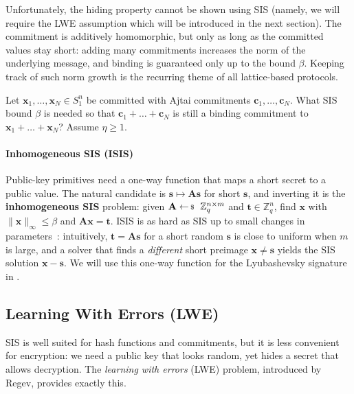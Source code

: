\documentclass[../../book.tex]{subfiles}
\begin{document}
Unfortunately, the hiding property cannot be shown using SIS (namely, we will require the LWE assumption which will be introduced in the next section).
The commitment is additively homomorphic, but only as long as the committed values stay short: adding many commitments increases the norm of the underlying message, and binding is guaranteed only up to the bound $\beta$.
Keeping track of such norm growth is the recurring theme of all lattice-based protocols.

\begin{exercise}
    Let $\mathbf{x}_1,\dots,\mathbf{x}_N \in S_1^n$ be committed with Ajtai commitments $\mathbf{c}_1,\dots,\mathbf{c}_N$.
    What SIS bound $\beta$ is needed so that $\mathbf{c}_1+\dots+\mathbf{c}_N$ is still a binding commitment to $\mathbf{x}_1+\dots+\mathbf{x}_N$? Assume $\eta \geq 1$.
    
\end{exercise}

\paragraph{Inhomogeneous SIS (ISIS)}
Public-key primitives need a one-way function that maps a short secret to a public value.
The natural candidate is $\mathbf{s} \mapsto \mathbf{A}\mathbf{s}$ for short $\mathbf{s}$, and inverting it is the \textbf{inhomogeneous SIS} problem: given $\mathbf{A} \leftarrowS \mathbb{Z}_q^{n \times m}$ and $\mathbf{t} \in \mathbb{Z}_q^n$, find $\mathbf{x}$ with $\|\mathbf{x}\|_{\infty} \leq \beta$ and $\mathbf{A}\mathbf{x} = \mathbf{t}$.
ISIS is as hard as SIS up to small changes in parameters~\cite{STOC:GenPeiVai08}: intuitively, $\mathbf{t} = \mathbf{A}\mathbf{s}$ for a short random $\mathbf{s}$ is close to uniform when $m$ is large, and a solver that finds a \emph{different} short preimage $\mathbf{x} \neq \mathbf{s}$ yields the SIS solution $\mathbf{x}-\mathbf{s}$.
We will use this one-way function for the Lyubashevsky signature in .

\subsection{Learning With Errors (LWE)}\label{section:lwe}

SIS is well suited for hash functions and commitments, but it is less convenient for encryption: we need a public key that looks random, yet hides a secret that allows decryption.
The \textit{learning with errors} (LWE) problem, introduced by Regev, provides exactly this.
\end{document}
